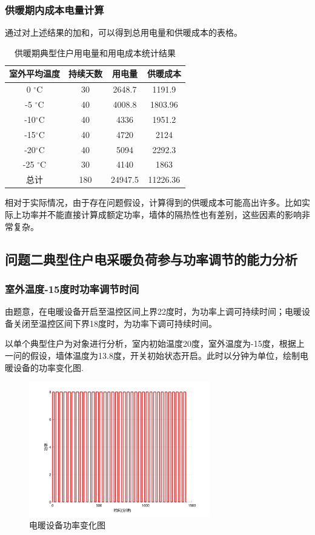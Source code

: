 \documentclass[withoutpreface,bwprint]{cumcmthesis} %
\begin{document}
\subsubsection{供暖期内成本电量计算}
通过对上述结果的加和，可以得到总用电量和供暖成本的表格。
\begin{table}[H]
		\centering
		\caption{供暖期典型住户用电量和用电成本统计结果}
\begin{tabular}{|c|c|c|c|}\hline
室外平均温度 &持续天数& 用电量 & 供暖成本 \\ \hline
0 $^\circ$C &30 & 2648.7  & 1191.9 \\ \hline
-5 $^\circ$C & 40& 4008.8 & 1803.96\\ \hline
  -10$^\circ$C &40 & 4336 & 1951.2\\ \hline
   -15$^\circ$C &40 & 4720 & 2124 \\ \hline
   -20$^\circ$C & 40& 5094  & 2292.3\\ \hline
    -25 $^\circ$C & 30 &4140 & 1863\\ \hline
    总计&180 & 24947.5 & 11226.36\\ \hline
\end{tabular}
\end{table}
相对于实际情况，由于存在问题假设，计算得到的供暖成本可能高出许多。比如实际上功率并不能直接计算成额定功率，墙体的隔热性也有差别，这些因素的影响非常复杂。

\subsection{问题二\quad 典型住户电采暖负荷参与功率调节的能力分析}
\subsubsection{室外温度-15度时功率调节时间}
由题意，在电暖设备开启至温控区间上界22度时，为功率上调可持续时间；电暖设备关闭至温控区间下界18度时，为功率下调可持续时间。

以单个典型住户为对象进行分析，室内初始温度20度，室外温度为-15度，根据上一问的假设，墙体温度为13.8度，开关初始状态开启。此时以分钟为单位，绘制电暖设备的功率变化图.

\begin{figure}[h]
\centering
    \includegraphics[width=0.7\textwidth]{figures/2-1-1.png}
    \caption{电暖设备功率变化图}
    \label{fig:my_label}
\end{figure}
\end{document}

